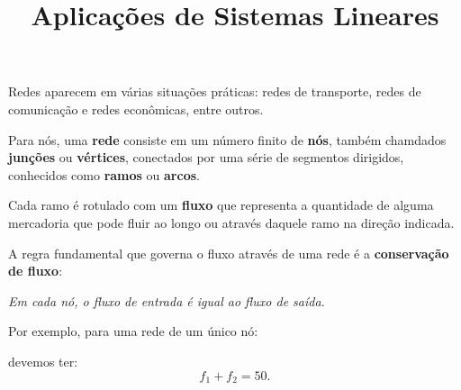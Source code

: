 \documentclass{beamer}
\title{Aplicações de Sistemas Lineares}
\author[\autor]{\autor}
\institute[\instituto]{\instituto}
\date{}
\begin{document}
    \begin{frame}
        \maketitle
    \end{frame}


    \begin{frame}

        Redes aparecem em várias situações práticas: \pause redes de transporte, \pause redes de comunicação \pause e redes econômicas, entre outros.\pause

        \vspace{1cm}

        Para nós, uma \textbf{rede} consiste em um número finito de \textbf{nós}, \pause também chamdados \textbf{junções} ou \textbf{vértices}, \pause conectados por uma série de segmentos dirigidos, \pause conhecidos como \textbf{ramos} ou \textbf{arcos}.\pause

        \vspace{1cm}

        Cada ramo é rotulado com um \textbf{fluxo} \pause que representa a quantidade de alguma mercadoria \pause que pode fluir ao longo ou através daquele ramo na direção indicada.

    \end{frame}

    \begin{frame}
        A regra fundamental que governa o fluxo através de uma rede é a \textbf{conservação de fluxo}:\pause
        \begin{tcolorbox}[colback=green!30, colframe=green!80!blue, title=Conservação de fluxo]
            \textit{Em cada nó, o fluxo de entrada é igual ao fluxo de saída.}
        \end{tcolorbox}
    \end{frame}

    \begin{frame}
        Por exemplo, para uma rede de um único nó:
        \begin{figure}[!h]
            \centering
            
        \end{figure}\pause
        devemos ter:
        \[
            f_1 + f_2 = 50.
        \]
    \end{frame}
\end{document}
